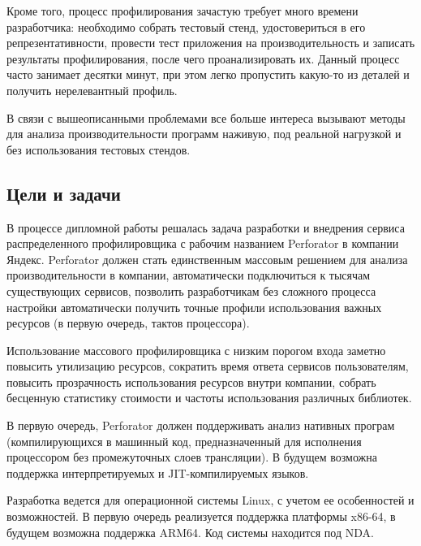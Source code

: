 Кроме того, процесс профилирования зачастую требует много времени разработчика: необходимо собрать тестовый стенд, удостовериться в его репрезентативности, провести тест приложения на производительность и записать результаты профилирования, после чего проанализировать их. Данный процесс часто занимает десятки минут, при этом легко пропустить какую-то из деталей и получить нерелевантный профиль.

В связи с вышеописанными проблемами все больше интереса вызывают методы для анализа производительности программ наживую, под реальной нагрузкой и без использования тестовых стендов.

\subsection{Цели и задачи}
В процессе дипломной работы решалась задача разработки и внедрения сервиса распределенного профилировщика
с рабочим названием Perforator в компании Яндекс.
Perforator должен стать единственным массовым решением для анализа производительности в компании,
автоматически подключиться к тысячам существующих сервисов,
позволить разработчикам без сложного процесса настройки автоматически получить точные профили использования важных ресурсов
(в первую очередь, тактов процессора).

Использование массового профилировщика с низким порогом входа заметно повысить утилизацию ресурсов, сократить время ответа сервисов пользователям, повысить прозрачность использования ресурсов внутри компании, собрать бесценную статистику стоимости и частоты использования различных библиотек.

В первую очередь, Perforator должен поддерживать анализ нативных програм
(компилирующихся в машинный код, предназначенный для исполнения процессором без промежуточных слоев трансляции).
В будущем возможна поддержка интерпретируемых и JIT-компилируемых языков.

Разработка ведется для операционной системы Linux, с учетом ее особенностей и возможностей.
В первую очередь реализуется поддержка платформы x86-64, в будущем возможна поддержка ARM64.
Код системы находится под NDA.
